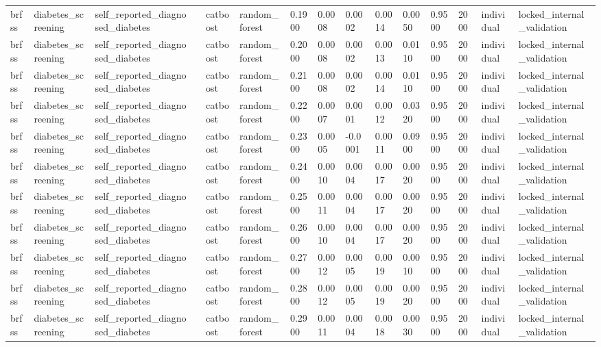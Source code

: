 \begin{tabular}{lllllllllllllll}
brfss & diabetes\_screening & self\_reported\_diagnosed\_diabetes &  & catboost & random\_forest & 0.1900 & 0.0008 & 0.0002 & 0.0014 & 0.0050 & 0.9500 & 2000 & individual & locked\_internal\_validation \\
brfss & diabetes\_screening & self\_reported\_diagnosed\_diabetes &  & catboost & random\_forest & 0.2000 & 0.0008 & 0.0002 & 0.0013 & 0.0110 & 0.9500 & 2000 & individual & locked\_internal\_validation \\
brfss & diabetes\_screening & self\_reported\_diagnosed\_diabetes &  & catboost & random\_forest & 0.2100 & 0.0008 & 0.0002 & 0.0014 & 0.0110 & 0.9500 & 2000 & individual & locked\_internal\_validation \\
brfss & diabetes\_screening & self\_reported\_diagnosed\_diabetes &  & catboost & random\_forest & 0.2200 & 0.0007 & 0.0001 & 0.0012 & 0.0320 & 0.9500 & 2000 & individual & locked\_internal\_validation \\
brfss & diabetes\_screening & self\_reported\_diagnosed\_diabetes &  & catboost & random\_forest & 0.2300 & 0.0005 & -0.0001 & 0.0011 & 0.0900 & 0.9500 & 2000 & individual & locked\_internal\_validation \\
brfss & diabetes\_screening & self\_reported\_diagnosed\_diabetes &  & catboost & random\_forest & 0.2400 & 0.0010 & 0.0004 & 0.0017 & 0.0020 & 0.9500 & 2000 & individual & locked\_internal\_validation \\
brfss & diabetes\_screening & self\_reported\_diagnosed\_diabetes &  & catboost & random\_forest & 0.2500 & 0.0011 & 0.0004 & 0.0017 & 0.0020 & 0.9500 & 2000 & individual & locked\_internal\_validation \\
brfss & diabetes\_screening & self\_reported\_diagnosed\_diabetes &  & catboost & random\_forest & 0.2600 & 0.0010 & 0.0004 & 0.0017 & 0.0020 & 0.9500 & 2000 & individual & locked\_internal\_validation \\
brfss & diabetes\_screening & self\_reported\_diagnosed\_diabetes &  & catboost & random\_forest & 0.2700 & 0.0012 & 0.0005 & 0.0019 & 0.0010 & 0.9500 & 2000 & individual & locked\_internal\_validation \\
brfss & diabetes\_screening & self\_reported\_diagnosed\_diabetes &  & catboost & random\_forest & 0.2800 & 0.0012 & 0.0005 & 0.0019 & 0.0020 & 0.9500 & 2000 & individual & locked\_internal\_validation \\
brfss & diabetes\_screening & self\_reported\_diagnosed\_diabetes &  & catboost & random\_forest & 0.2900 & 0.0011 & 0.0004 & 0.0018 & 0.0030 & 0.9500 & 2000 & individual & locked\_internal\_validation \\

\end{tabular}

